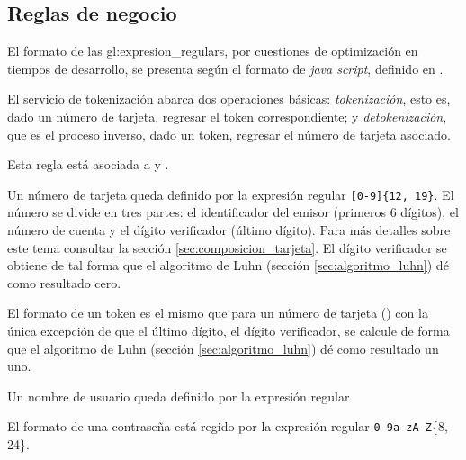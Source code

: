 %
%

\subsection{Reglas de negocio}

El formato de las \glspl{gl:expresion_regular}, por cuestiones de optimización
en tiempos de desarrollo, se presenta según el formato de \textit{java script},
definido en \cite{mozilla_er}.

{
  El servicio de tokenización abarca dos operaciones básicas:
  \textit{tokenización}, esto es, dado un número de tarjeta, regresar el token
  correspondiente; y \textit{detokenización}, que es el proceso inverso, dado un
  token, regresar el número de tarjeta asociado.

  Esta regla está asociada a  y
  .
}

{
  Un número de tarjeta queda definido por la expresión regular
  \texttt{[0-9]\{12, 19\}}. El número se divide en tres partes: el
  identificador del emisor (primeros 6 dígitos), el número de cuenta y el dígito
  verificador (último dígito). Para más detalles sobre este tema consultar la
  sección \ref{sec:composicion_tarjeta}. El dígito verificador se obtiene de tal
  forma que el algoritmo de Luhn (sección \ref{sec:algoritmo_luhn}) dé como
  resultado cero.
}

{
  El formato de un token es el mismo que para un número de tarjeta
  () con la única excepción de que el
  último dígito, el dígito verificador, se calcule de forma que el algoritmo de
  Luhn (sección \ref{sec:algoritmo_luhn}) dé como resultado un uno.
}

{
  Un nombre de usuario queda definido por la expresión regular
}


{
  El formato de una contraseña está regido por la expresión regular
  \texttt{0-9a-zA-Z}\{8, 24\}.
}

